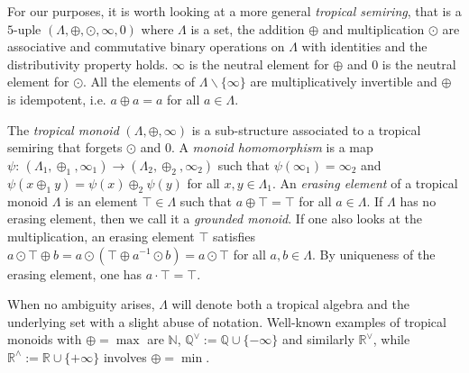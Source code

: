 \documentclass[11pt,british,reqno]{article}
\numberwithin{equation}{section}
\numberwithin{figure}{section}
\numberwithin{table}{section}
\theoremstyle{definition}
\theoremstyle{definition}
\theoremstyle{plain}
\theoremstyle{plain}
\theoremstyle{remark}
\theoremstyle{plain}
\numberwithin{equation}{section}
\numberwithin{figure}{section}
\numberwithin{table}{section}
\theoremstyle{plain}
\begin{document}
For our purposes, it is worth looking at a more general \textit{tropical semiring}, that is a $5$-uple $(\Lambda,\oplus,\odot,\infty,0)$ where $\Lambda$ is a set, the addition $\oplus$ and multiplication $\odot$ are associative and commutative binary operations
on $\Lambda$ with identities and the distributivity property holds. $\infty$ is the neutral element for $\oplus$ and $0$ is the neutral element for $\odot$. All the elements of $\Lambda\backslash\{\infty\}$ are multiplicatively
invertible and $\oplus$ is idempotent, i.e. $a\oplus a=a$ for all $a\in\Lambda$. 

The \textit{tropical monoid} $(\Lambda,\oplus,\infty)$ is a sub-structure associated to a tropical semiring that forgets $\odot$ and $0$. A \textit{monoid
homomorphism} is a map $\psi:\,(\Lambda_{1},\oplus_{1},\infty_{1})\longrightarrow(\Lambda_{2},\oplus_{2},\infty_{2})$
such that $\psi(\infty_{1})=\infty_{2}$ and $\psi(x\oplus_{1}y)=\psi(x)\oplus_{2}\psi(y)$
for all $x,y\in\Lambda_{1}$. An \textit{erasing element} of a tropical
monoid $\Lambda$ is an element $\top\in\Lambda$ such that $a\oplus\top=\top$
for all $a\in\Lambda$. If $\Lambda$ has no erasing element, then
we call it a \textit{grounded monoid}. If one also looks at the multiplication, an erasing element $\top$ satisfies $a\odot\top\oplus b=a\odot(\top\oplus a^{-1}\odot b)=a\odot\top$
for all $a,b\in\Lambda$. By uniqueness of the erasing element, one has $a\cdot\top=\top$.

When no ambiguity arises, $\Lambda$ will denote both a tropical algebra
and the underlying set with a slight abuse of notation. Well-known
examples of tropical monoids with $\oplus=\max$ are $\mathbb{N}$,
$\mathbb{Q}^{\vee}:=\mathbb{Q}\cup\{-\infty\}$ and similarly $\mathbb{R}^{\vee}$,
while $\mathbb{R}^{\wedge}:=\mathbb{R}\cup\{+\infty\}$ involves $\oplus=\min$. 
\end{document}
